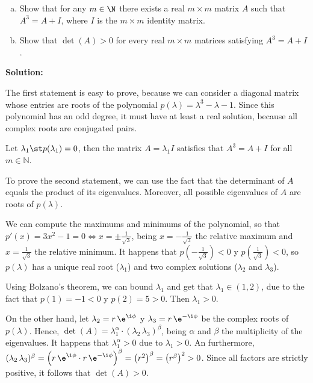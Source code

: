 \documentclass[../../main.tex]{subfiles}
\begin{document}
  \begin{shaded}
    \begin{enumerate}[a)]
      \item Show that for any $m \in \N$ there exists a real $m \times m$ matrix $A$ such that $A^3 = A + I$, where $I$ is the $m \times m$ identity matrix.
      \item Show that $\det{(A)} > 0$ for every real $m \times m$ matrices satisfying $A^3 = A + I$.
    \end{enumerate}
  \end{shaded}

  \textbf{Solution:}

  The first statement is easy to prove, because we can consider a diagonal matrix whose entries are roots of the polynomial $p(\lambda) = \lambda^3 - \lambda - 1$. Since this polynomial has an odd degree, it must have at least a real solution, because all complex roots are conjugated pairs.

  Let $\lambda_1 \st p(\lambda_1) = 0$, then the matrix $A = \lambda_1 I$ satisfies that $A^3 = A + I$ for all $m \in \mathbb{N}$.

  To prove the second statement, we can use the fact that the determinant of $A$ equals the product of its eigenvalues. Moreover, all possible eigenvalues of $A$ are roots of $p(\lambda)$.

  We can compute the maximums and minimums of the polynomial, so that $p'(x) = 3x^2 - 1 = 0 \iff x = \pm \displaystyle\frac{1}{\sqrt{3}}$, being $x = -\displaystyle\frac{1}{\sqrt{3}}$ the relative maximum and $x = \displaystyle\frac{1}{\sqrt{3}}$ the relative minimum. It happens that $p\left(-\displaystyle\frac{1}{\sqrt{3}}\right) < 0$ y $p\left(\displaystyle\frac{1}{\sqrt{3}}\right) < 0$, so $p(\lambda)$ has a unique real root ($\lambda_1$) and two complex solutions ($\lambda_2$ and $\lambda_3$).

  Using Bolzano's theorem, we can bound $\lambda_1$ and get that $\lambda_1 \in (1, 2)$, due to the fact that $p(1) = -1 < 0$ y $p(2) = 5 > 0$. Then $\lambda_1 > 0$.

  On the other hand, let $\lambda_2 = r \, \e^{\i\phi}$ y $\lambda_3 = r \, \e^{-\i\phi}$ be the complex roots of $p(\lambda)$. Hence, $\det{(A)} = \lambda_1^\alpha \cdot (\lambda_2 \, \lambda_3)^\beta$, being $\alpha$ and $\beta$ the multiplicity of the eigenvalues. It happens that $\lambda_1^\alpha > 0$ due to $\lambda_1 > 0$. An furthermore, $(\lambda_2 \, \lambda_3)^\beta = \left(r \, \e^{\i\phi} \cdot r \, \e^{-\i\phi} \right)^\beta = \left(r^2\right)^\beta = \left(r^\beta\right)^2 > 0$. Since all factors are strictly positive, it follows that $\det{(A)} > 0$.
\end{document}
